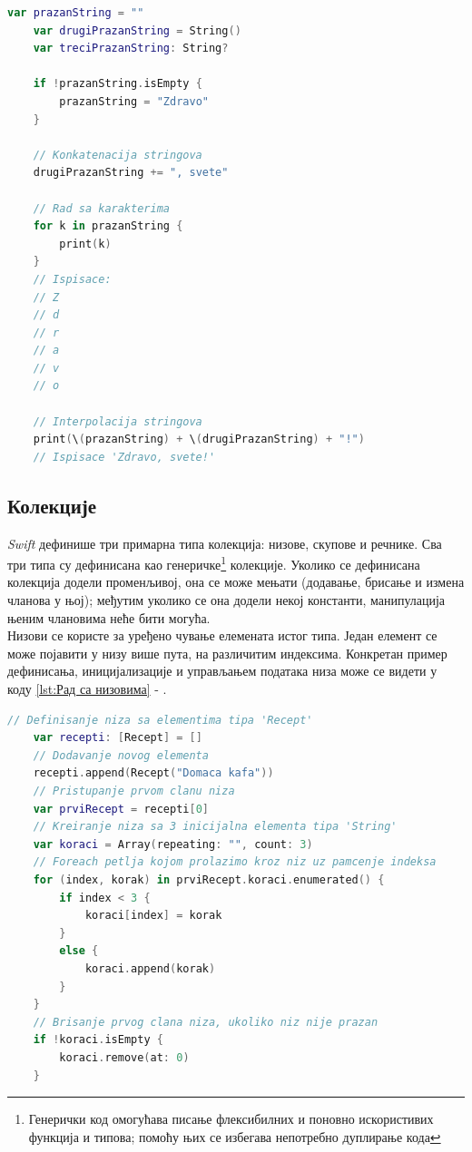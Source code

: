 \documentclass[12pt,oneside]{memoir}
\begin{document}
\begin{lstlisting}[caption=\textit{{Операције над стринговима}}, label={lst:Операције над стринговима}, language=Swift, frame=single]
    var prazanString = ""
    var drugiPrazanString = String()
    var treciPrazanString: String?
    
    if !prazanString.isEmpty {
        prazanString = "Zdravo"
    }
    
    // Konkatenacija stringova
    drugiPrazanString += ", svete"
    
    // Rad sa karakterima
    for k in prazanString {
        print(k)
    }
    // Ispisace: 
    // Z
    // d
    // r
    // a
    // v
    // o
    
    // Interpolacija stringova
    print(\(prazanString) + \(drugiPrazanString) + "!")
    // Ispisace 'Zdravo, svete!'
\end{lstlisting}


\subsection{Колекције}
\label{subsec:Колекције}

\indent \textit{Swift} дефинише три примарна типа колекција: низове, скупове и речнике. Сва три типа су дефинисана као генеричке\footnote{Генерички код омогућава писање флексибилних и поновно искористивих функција и типова; помоћу њих се избегава непотребно дуплирање кода} колекције. Уколико се дефинисана колекција додели променљивој, она се може мењати (додавање, брисање и измена чланова у њој); међутим уколико се она додели некој константи, манипулација њеним члановима неће бити могућа. \\

\indent Низови се користе за уређено чување елемената истог типа. Један елемент се може појавити у низу више пута, на различитим индексима. Конкретан пример дефинисања, иницијализације и управљањем података низа може се видети у коду \ref{lst:Рад са низовима} - .

\begin{lstlisting}[caption=\textit{{Рад са низовима}}, label={lst:Рад са низовима}, language=Swift, frame=single]
    // Definisanje niza sa elementima tipa 'Recept'
    var recepti: [Recept] = []
    // Dodavanje novog elementa
    recepti.append(Recept("Domaca kafa"))
    // Pristupanje prvom clanu niza
    var prviRecept = recepti[0]
    // Kreiranje niza sa 3 inicijalna elementa tipa 'String'
    var koraci = Array(repeating: "", count: 3)
    // Foreach petlja kojom prolazimo kroz niz uz pamcenje indeksa
    for (index, korak) in prviRecept.koraci.enumerated() {
        if index < 3 {
            koraci[index] = korak
        }
        else {
            koraci.append(korak)
        }
    }
    // Brisanje prvog clana niza, ukoliko niz nije prazan
    if !koraci.isEmpty {
        koraci.remove(at: 0)
    }
\end{lstlisting}
\end{document}
